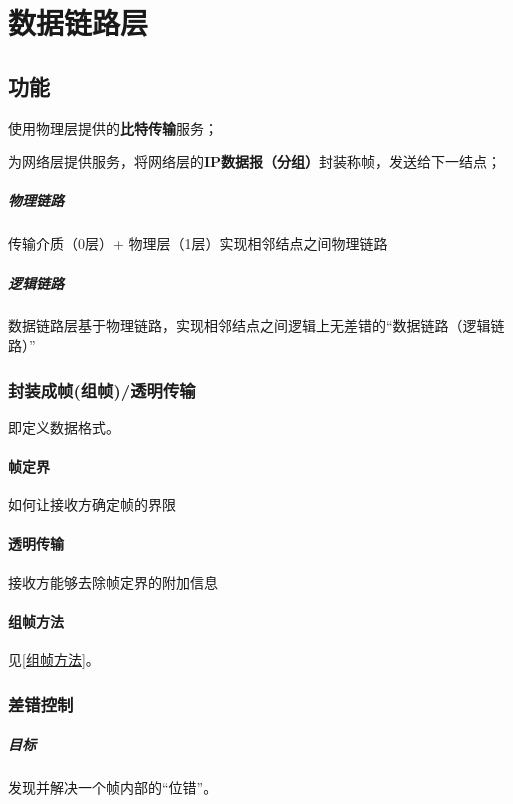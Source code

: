
\chapter{数据链路层}

\section{功能}

使用物理层提供的\textbf{比特传输}服务；

为网络层提供服务，将网络层的\textbf{IP数据报（分组）}封装称帧，发送给下一结点；


\paragraph{物理链路}
传输介质（0层）+ 物理层（1层）实现相邻结点之间物理链路

\paragraph{逻辑链路}
数据链路层基于物理链路，实现相邻结点之间逻辑上无差错的“数据链路（逻辑链路）”


\subsection{封装成帧(组帧)/透明传输}
即定义数据格式。

\subsubsection{帧定界}
如何让接收方确定帧的界限


\subsubsection{透明传输}
接收方能够去除帧定界的附加信息


\subsubsection{组帧方法}
见\ref{组帧方法}。


\subsection{差错控制}

\paragraph{目标}
发现并解决一个帧内部的“位错”。


